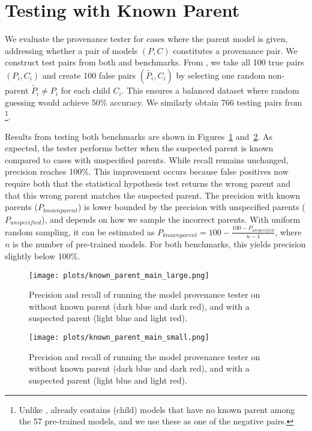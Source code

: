 \section{Testing with Known Parent}
\label{sec:appendix:known_parent}


We evaluate the provenance tester for cases where the parent model is given, addressing whether a pair of models $(P,C)$ constitutes a provenance pair.
%
We construct test pairs from both \bencho and \bencht benchmarks. From \bencho, we take all 100 true pairs $(P_i,C_i)$ and create 100 false pairs $(\tilde{P_i},C_i)$ by selecting one random non-parent $\tilde{P_i}\neq P_i$ for each child $C_i$. This ensures a balanced dataset where random guessing would achieve 50\% accuracy. We similarly obtain 766 testing pairs from \bencht\footnote{Unlike \bencho, \bencht already contains (child) models that have no known parent among the 57 pre-trained models, and we use these as one of the negative pairs.}.

Results from testing both benchmarks are shown in Figures~\ref{fig:eval:known-parent-a} and~\ref{fig:eval:known-parent-b}. As expected, the tester performs better when the suspected parent is known compared to cases with unspecified parents. While recall remains unchanged, precision reaches 100\%.
This improvement occurs because false positives now require both that the statistical hypothesis test returns the wrong parent and that this wrong parent matches the suspected parent. The precision with known parents ($P_{known parent}$) is lower bounded by the precision with unspecified parents ($P_{unspecified}$), and depends on how we sample the incorrect parents. With uniform random sampling, it can be estimated as $P_{known parent} = 100 - \frac{100-P_{unspecified}}{n-1}$, where $n$ is the number of pre-trained models. For both benchmarks, this yields precision slightly below 100\%.

\begin{figure}[H]
  \texttt{[image: plots/known\_parent\_main\_large.png]}
  \caption{Precision and recall of running the model provenance tester on \bencho without known parent  (dark blue and dark red), and with a suspected parent (light blue and light red).}
  \label{fig:eval:known-parent-a}
\end{figure}
\begin{figure}[H]
    \texttt{[image: plots/known\_parent\_main\_small.png]}
    \caption{Precision and recall of running the model provenance tester on \bencht without known parent  (dark blue and dark red), and with a suspected parent (light blue and light red).}
    \label{fig:eval:known-parent-b}
\end{figure}
